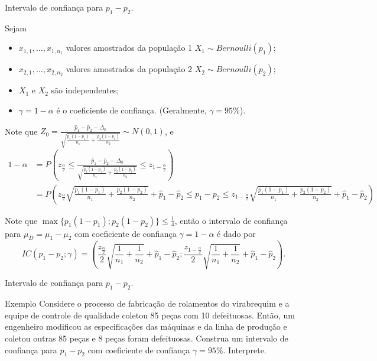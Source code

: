 \documentclass[9pt]{beamer}
\begin{document}
\begin{frame}{Intervalo de confiança para $p_1-p_2$.}

Sejam
\begin{itemize}
	\item $x_{1,1}, \dots, x_{1,n_1}$ valores amostrados da população 1 $X_1 \sim Bernoulli(p_1)$;
	\item $x_{2,1}, \dots, x_{2,n_2}$ valores amostrados da população 2 $X_2 \sim Bernoulli(p_2)$;
	\item $X_1$ e $X_2$ são independentes;
	\item $\gamma=1-\alpha$ é o coeficiente de confiança. (Geralmente, $\gamma=95\%$).
\end{itemize}
\vfill

Note que $Z_0 = \frac{\hat{p}_1 - \hat{p}_2 - \Delta_0}{\sqrt{ \frac{p_1(1-p_1)}{n_1} + \frac{p_2(1-p_2)}{n_2} }} \sim N(0,1)$, e 
{\tiny
	\begin{align*}
	1-\alpha &= P \left( z_\frac{\alpha}{2} \leq \frac{\hat{p}_1 - \hat{p}_2 - \Delta_0}{\sqrt{ \frac{p_1(1-p_1)}{n_1} + \frac{p_2(1-p_2)}{n_2} }} \leq z_{1-\frac{\alpha}{2}} \right)\\
	&= P \left( z_\frac{\alpha}{2} \sqrt{\frac{p_1(1-p_1)}{n_1} + \frac{p_2(1-p_2)}{n_2}} + \hat{p}_1 - \hat{p}_2 \leq p_1 - p_2 \leq z_{1-\frac{\alpha}{2}} \sqrt{\frac{p_1(1-p_1)}{n_1} + \frac{p_2(1-p_2)}{n_2}} + \hat{p}_1 - \hat{p}_2 \right)
	\end{align*}
}
\vfill

Note que $\max\{p_1(1-p_1);p_2(1-p_2) \} \leq \frac{1}{4}$, então o intervalo de confiança para $\mu_D = \mu_1 - \mu_2$ com coeficiente de confiança $\gamma=1-\alpha$ é dado por
$$IC\left(p_1 - p_2; \gamma\right) = \left( \frac{z_\frac{\alpha}{2}}{2} \sqrt{\frac{1}{n_1} + \frac{1}{n_2}} + \hat{p}_1 - \hat{p}_2; \frac{z_{1-\frac{\alpha}{2}}}{2} \sqrt{\frac{1}{n_1} + \frac{1}{n_2}} + \hat{p}_1 - \hat{p}_2 \right).$$


\end{frame}

\begin{frame}{Intervalo de confiança para $p_1 - p_2$.}

\large
\begin{block}{Exemplo}
Considere o processo de fabricação de rolamentos do virabrequim e a equipe de controle de qualidade coletou 85 peças com 10 defeituosas. Então, um engenheiro modificou as especificações das máquinas e da linha de produção e coletou outras 85 peças e 8 peças foram defeituosas. Construa um intervalo de confiança para $p_1 - p_2$ com coeficiente de confiança $\gamma=95\%$. Interprete.
\end{block}
\normalsize

\end{frame}
\end{document}
